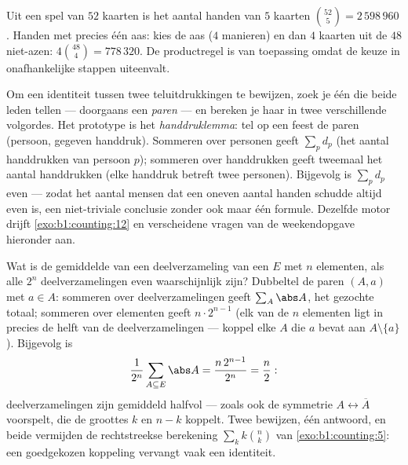 \begin{example}\label{ex:b1:counting:poker}
Uit een spel van $52$ kaarten is het aantal handen van $5$ kaarten
$\binom{52}{5} = 2\,598\,960$. Handen met precies één aas: kies de aas
($4$ manieren) en dan $4$ kaarten uit de $48$ niet-azen: $4
\binom{48}{4} = 778\,320$. De productregel is van toepassing omdat de
keuze in onafhankelijke stappen uiteenvalt.
\end{example}

\begin{method}[Dubbeltellen]\label{met:b1:counting:doublecount}
Om een identiteit tussen twee teluitdrukkingen te bewijzen, zoek je één
 die beide leden tellen --- doorgaans een 
\emph{paren} --- en bereken je haar  in twee verschillende
volgordes. Het prototype is het \emph{handdruklemma}: tel op een feest de
paren (persoon, gegeven handdruk). Sommeren over personen geeft $\sum_p
d_p$ (het aantal handdrukken van persoon $p$); sommeren over handdrukken
geeft tweemaal het aantal handdrukken (elke handdruk betreft twee
personen). Bijgevolg is $\sum_p d_p$ even --- zodat het aantal mensen dat
een oneven aantal handen schudde altijd even is, een niet-triviale
conclusie zonder ook maar één formule. Dezelfde motor drijft
\cref{exo:b1:counting:12} en verscheidene vragen van de weekendopgave
hieronder aan.
\end{method}

\begin{example}\label{ex:b1:counting:averagesubset}
Wat is de gemiddelde  van een deelverzameling van een
 $E$ met $n$ elementen, als alle $2^n$ deelverzamelingen
even waarschijnlijk zijn? Dubbeltel de paren $(A, a)$ met $a \in A$:
sommeren over deelverzamelingen geeft $\sum_A \abs A$, het gezochte
totaal; sommeren over elementen geeft $n \cdot 2^{n-1}$ (elk van de
$n$ elementen ligt in precies de helft van de deelverzamelingen ---
koppel elke $A$ die $a$ bevat aan $A \setminus \{a\}$). Bijgevolg is
\[
\frac{1}{2^n}\sum_{A \subseteq E} \abs A
= \frac{n\,2^{n-1}}{2^n} = \frac n2 :
\]
deelverzamelingen zijn gemiddeld halfvol --- zoals ook de symmetrie
$A \leftrightarrow \overline A$ voorspelt, die de groottes $k$ en
$n - k$ koppelt. Twee bewijzen, één antwoord, en beide vermijden de
rechtstreekse berekening $\sum_k k\binom nk$ van
\cref{exo:b1:counting:5}: een goedgekozen koppeling vervangt vaak
een identiteit.
\end{example}

